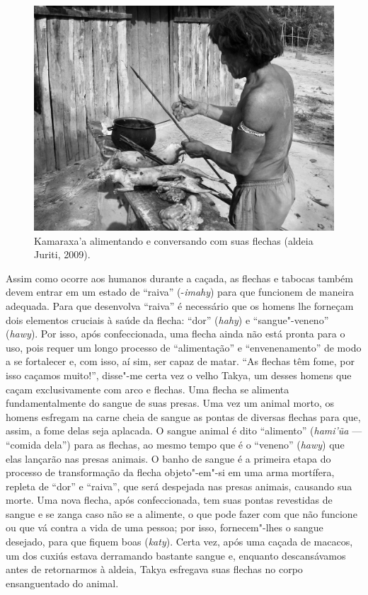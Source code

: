 \begin{figure}[!hb]
\centering
  \includegraphics[width=\textwidth]{./imgs/100_5107}
\caption{Kamaraxa’a alimentando e conversando com suas flechas (aldeia Juriti, 2009).}
\end{figure}

Assim como ocorre aos humanos durante a caçada, as flechas e tabocas
também devem entrar em um estado de ``raiva'' (-\emph{imahy}) para que
funcionem de maneira adequada. Para que desenvolva ``raiva'' é necessário
que os homens lhe forneçam dois elementos cruciais à saúde da flecha:
``dor'' (\emph{hahy}) e ``sangue"-veneno'' (\emph{hawy}). Por isso, após
confeccionada, uma flecha ainda não está pronta para o uso, pois requer
um longo processo de ``alimentação'' e ``envenenamento'' de modo a se
fortalecer e, com isso, aí sim, ser capaz de matar. ``As flechas têm
fome, por isso caçamos muito!'', disse"-me certa vez o velho Takya, um
desses homens que caçam exclusivamente com arco e flechas. Uma flecha se
alimenta fundamentalmente do sangue de suas presas. Uma vez um animal
morto, os homens esfregam na carne cheia de sangue as pontas de diversas
flechas para que, assim, a fome delas seja aplacada. O sangue animal é
dito ``alimento'' (\emph{hami'ũa} --- ``comida dela'') para as flechas, ao
mesmo tempo que é o ``veneno'' (\emph{hawy}) que elas lançarão nas presas
animais. O banho de sangue é a primeira etapa do processo de
transformação da flecha objeto"-em"-si em uma arma mortífera, repleta de
``dor'' e ``raiva'', que será despejada nas presas animais, causando sua
morte. Uma nova flecha, após confeccionada, tem suas pontas revestidas
de sangue e se zanga caso não se a alimente, o que pode fazer com que
não funcione ou que vá contra a vida de uma pessoa; por isso,
fornecem"-lhes o sangue desejado, para que fiquem boas (\emph{katy}).
Certa vez, após uma caçada de macacos, um dos cuxiús estava derramando
bastante sangue e, enquanto descansávamos antes de retornarmos à aldeia,
Takya esfregava suas flechas no corpo ensanguentado do animal.

